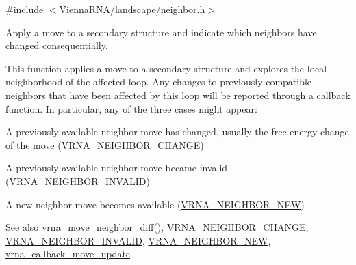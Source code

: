 {\ttfamily \#include $<$\mbox{\hyperlink{landscape_2neighbor_8h}{Vienna\+R\+N\+A/landscape/neighbor.\+h}}$>$}



Apply a move to a secondary structure and indicate which neighbors have changed consequentially. 

This function applies a move to a secondary structure and explores the local neighborhood of the affected loop. Any changes to previously compatible neighbors that have been affected by this loop will be reported through a callback function. In particular, any of the three cases might appear\+:
\begin{DoxyItemize}
\item A previously available neighbor move has changed, usually the free energy change of the move (\mbox{\hyperlink{group__neighbors_gae72b0e349b6108c00737df51cce44622}{V\+R\+N\+A\+\_\+\+N\+E\+I\+G\+H\+B\+O\+R\+\_\+\+C\+H\+A\+N\+GE}})
\item A previously available neighbor move became invalid (\mbox{\hyperlink{group__neighbors_gaf7e3417828057ae0ed4d0de03178116a}{V\+R\+N\+A\+\_\+\+N\+E\+I\+G\+H\+B\+O\+R\+\_\+\+I\+N\+V\+A\+L\+ID}})
\item A new neighbor move becomes available (\mbox{\hyperlink{group__neighbors_ga9343dd62daad15b6b8c55c1260c09228}{V\+R\+N\+A\+\_\+\+N\+E\+I\+G\+H\+B\+O\+R\+\_\+\+N\+EW}})
\end{DoxyItemize}

\begin{DoxySeeAlso}{See also}
\mbox{\hyperlink{group__neighbors_gaa3e8c627d24912974922c5ae805e15e0}{vrna\+\_\+move\+\_\+neighbor\+\_\+diff()}}, \mbox{\hyperlink{group__neighbors_gae72b0e349b6108c00737df51cce44622}{V\+R\+N\+A\+\_\+\+N\+E\+I\+G\+H\+B\+O\+R\+\_\+\+C\+H\+A\+N\+GE}}, \mbox{\hyperlink{group__neighbors_gaf7e3417828057ae0ed4d0de03178116a}{V\+R\+N\+A\+\_\+\+N\+E\+I\+G\+H\+B\+O\+R\+\_\+\+I\+N\+V\+A\+L\+ID}}, \mbox{\hyperlink{group__neighbors_ga9343dd62daad15b6b8c55c1260c09228}{V\+R\+N\+A\+\_\+\+N\+E\+I\+G\+H\+B\+O\+R\+\_\+\+N\+EW}}, \mbox{\hyperlink{group__neighbors_ga4605019694e3d38e2c40d5a97ef99920}{vrna\+\_\+callback\+\_\+move\+\_\+update}}
\end{DoxySeeAlso}

